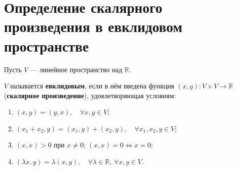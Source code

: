 \section{Определение скалярного произведения в евклидовом пространстве}

\begin{definition}
Пусть $V$ --- линейное пространство над $\mathbb{R}$.

$V$ называется \textbf{евклидовым}, если в нём введена функция $(x, y): V \times V \to \mathbb{R}$ (\textbf{скалярное произведение}), удовлетворяющая условиям:
\begin{enumerate}
    \item $(x, y) = (y, x),\quad \forall x, y \in V$;
    \item $(x_1 + x_2, y) = (x_1, y) + (x_2, y),\quad \forall x_1, x_2, y \in V$;
    \item $(x, x) > 0$ при $x \neq 0$; $(x, x) = 0 \iff x = 0$;
    \item $(\lambda x, y) = \lambda (x, y),\quad \forall \lambda \in \mathbb{R},\ \forall x, y \in V$.
\end{enumerate}
\end{definition}
